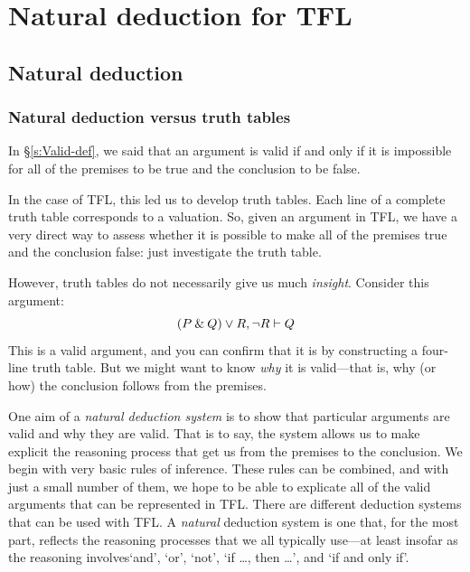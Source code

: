 \graphicspath{{figures--proofs/}}
\part{Natural deduction for TFL}
\label{ch.NDTFL}

\chapter{Natural deduction}\label{s:NDVeryIdea}

\section{Natural deduction versus truth tables}

In \S\ref{s:Valid-def}, we said that an argument is valid if and only if it is impossible for all of the premises to be true and the conclusion to be false. 

In the case of TFL, this led us to develop truth tables. Each line of a complete truth table corresponds to a valuation. So, given an argument in TFL, we have a very direct way to assess whether it is possible to make all of the premises true and the conclusion false: just investigate the truth table.

However, truth tables do not necessarily give us much \emph{insight}. Consider this argument:
$$(P \mathbin{\&} Q) \vee R, {\neg} R \vdash Q$$
This is a valid argument, and you can confirm that it is by constructing a four-line truth table. But we might want to know \textit{why} it is valid---that is, why (or how) the conclusion follows from the premises. 

One aim of a \emph{natural deduction system} is to show that particular arguments are valid and why they are valid. That is to say, the system allows us to make explicit the reasoning process that get us from the premises to the conclusion. We begin with very basic rules of inference. These rules can be combined, and with just a small number of them, we hope to be able to explicate all of the valid arguments that can be represented in TFL. There are different deduction systems that can be used with TFL. A \textit{natural} deduction system is one that, for the most part, reflects the reasoning processes that we all typically use---at least insofar as the reasoning involves`and', `or', `not', `if \ldots, then \ldots', and `if and only if'.


